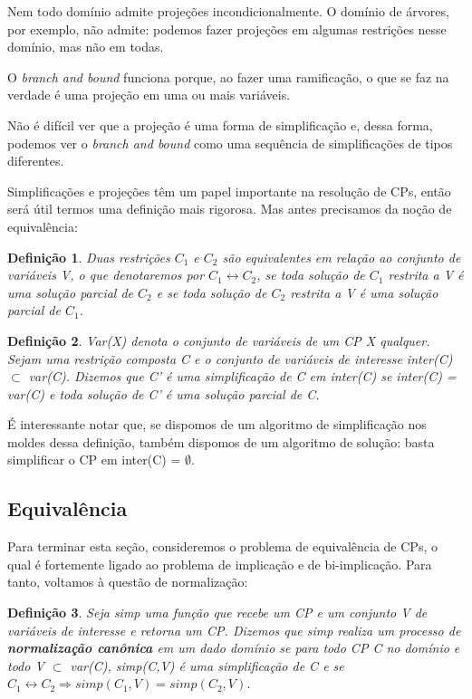 \documentclass{article}
\newtheorem{definition}{Definição}[section]
\theoremstyle{remark}
\theoremstyle{theorem}
\begin{document}
Nem todo domínio admite projeções incondicionalmente. O domínio de árvores, por exemplo, não admite: podemos fazer projeções em algumas restrições nesse domínio, mas não em todas.

O \textit{branch and bound} funciona porque, ao fazer uma ramificação, o que se faz na verdade é uma projeção em uma ou mais variáveis.

Não é difícil ver que a projeção é uma forma de simplificação e, dessa forma, podemos ver o \textit{branch and bound} como uma sequência de simplificações de tipos diferentes.

Simplificações e projeções têm um papel importante na resolução de CPs, então será útil termos uma definição mais rigorosa. Mas antes precisamos da noção de equivalência:

\begin{definition}
  Duas restrições $C_1$ e $C_2$ são equivalentes em relação ao conjunto de variáveis V, o que denotaremos por $C_1 \leftrightarrow C_2$, se toda solução de $C_1$ restrita a V é uma solução parcial de $C_2$ e se toda solução de $C_2$ restrita a V é uma solução parcial de $C_1$.
\end{definition}

\begin{definition}
  Var(X) denota o conjunto de variáveis de um CP X qualquer. Sejam uma restrição composta C e o conjunto de variáveis de interesse inter(C) $\subset$ var(C). Dizemos que C' é uma simplificação de C em inter(C) se inter(C) = var(C) e toda solução de C' é uma solução parcial de C.
\end{definition}

É interessante notar que, se dispomos de um algoritmo de simplificação nos moldes dessa definição, também dispomos de um algoritmo de solução: basta simplificar o CP em inter(C) = $\emptyset$.

\subsection{Equivalência}

  Para terminar esta seção, consideremos o problema de equivalência de CPs, o qual é fortemente ligado ao problema de implicação e de bi-implicação. Para tanto, voltamos à questão de normalização:

  \begin{definition}
    Seja \textit{simp} uma função que recebe um CP e um conjunto V de variáveis de interesse e retorna um CP. Dizemos que \textit{simp} realiza um processo de \textbf{normalização canônica} em um dado domínio se para todo CP C no domínio e todo V $\subset$ var(C), simp(C,V) é uma simplificação de C e se $C_1 \leftrightarrow C_2 \Rightarrow simp(C_1,V) = simp(C_2,V)$.
  \end{definition}
\end{document}
